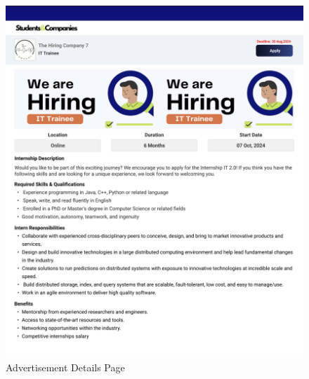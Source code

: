 \documentclass[a4paper,12pt]{article}
\begin{document}
\begin{figure}[H]
    \centering
    \includegraphics[scale = 0.55]{figures/UserInterfaces/Student/AdvertisementPage.png}
    \caption{Advertisement Details Page}
     \centering
\end{figure}
\end{document}
